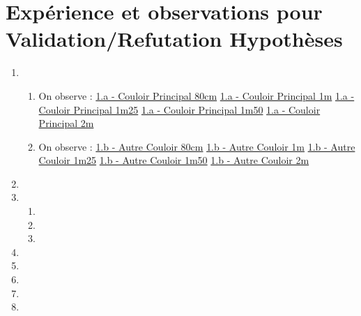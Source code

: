 \documentclass[12pt]{article}
\begin{document}
\section{Expérience et observations pour Validation/Refutation Hypothèses}

\begin{enumerate}
    \item 
    \begin{enumerate}
        \item On observe :
        \newline
        \underline{1.a -  Couloir Principal 80cm}
        \newline\newline
        \underline{1.a - Couloir Principal 1m}
        \newline\newline
        \underline{1.a - Couloir Principal 1m25}
        \newline\newline
        \underline{1.a - Couloir Principal 1m50}
        \newline\newline
        \underline{1.a - Couloir Principal 2m}

        \item On observe :
        \newline
        \underline{1.b - Autre Couloir 80cm}
        \newline\newline
        \underline{1.b - Autre Couloir 1m}
        \newline\newline
        \underline{1.b - Autre Couloir 1m25}
        \newline\newline
        \underline{1.b - Autre Couloir 1m50}
        \newline\newline
        \underline{1.b - Autre Couloir 2m}
    \end{enumerate}

    \item 

    \item    
    \begin{enumerate}
        \item 
        \item
        \item
    \end{enumerate}

    \item

    \item 

    \item 

    \item

    \item
\end{enumerate}
\end{document}
